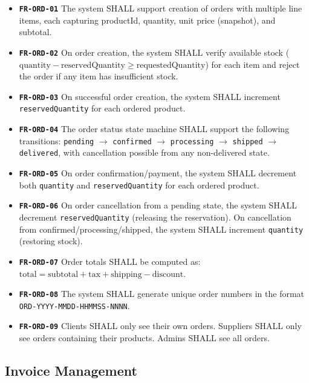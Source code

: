 ﻿\documentclass[12pt,a4paper]{report}
\newcommand{\req}[1]{\texttt{\textbf{\color{primary}#1}}}
\begin{document}
\begin{tcolorbox}[reqbox,title={FR-ORD: Order Requirements}]
\begin{itemize}[leftmargin=1.5em]
  \item \req{FR-ORD-01} The system SHALL support creation of orders with multiple line items, each capturing productId, quantity, unit price (snapshot), and subtotal.
  \item \req{FR-ORD-02} On order creation, the system SHALL verify available stock ($\text{quantity} - \text{reservedQuantity} \geq \text{requestedQuantity}$) for each item and reject the order if any item has insufficient stock.
  \item \req{FR-ORD-03} On successful order creation, the system SHALL increment \texttt{reservedQuantity} for each ordered product.
  \item \req{FR-ORD-04} The order status state machine SHALL support the following transitions: \texttt{pending} $\to$ \texttt{confirmed} $\to$ \texttt{processing} $\to$ \texttt{shipped} $\to$ \texttt{delivered}, with cancellation possible from any non-delivered state.
  \item \req{FR-ORD-05} On order confirmation/payment, the system SHALL decrement both \texttt{quantity} and \texttt{reservedQuantity} for each ordered product.
  \item \req{FR-ORD-06} On order cancellation from a pending state, the system SHALL decrement \texttt{reservedQuantity} (releasing the reservation). On cancellation from confirmed/processing/shipped, the system SHALL increment \texttt{quantity} (restoring stock).
  \item \req{FR-ORD-07} Order totals SHALL be computed as: $\text{total} = \text{subtotal} + \text{tax} + \text{shipping} - \text{discount}$.
  \item \req{FR-ORD-08} The system SHALL generate unique order numbers in the format \texttt{ORD-YYYY-MMDD-HHMMSS-NNNN}.
  \item \req{FR-ORD-09} Clients SHALL only see their own orders. Suppliers SHALL only see orders containing their products. Admins SHALL see all orders.
\end{itemize}
\end{tcolorbox}

\subsection{Invoice Management}
\end{document}
